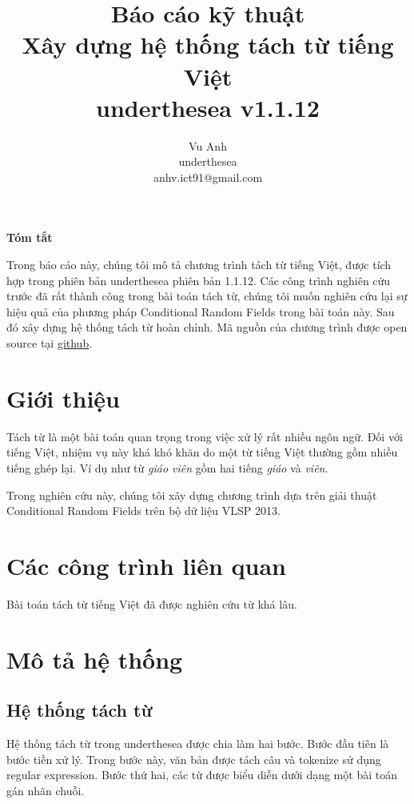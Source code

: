 \documentclass[11pt,a4paper]{article}
\title{Báo cáo kỹ thuật\\ Xây dựng hệ thống tách từ tiếng Việt \\ underthesea v1.1.12}
\author{
Vu Anh\\
underthesea\\
anhv.ict91@gmail.com
}
\date{}
\renewenvironment{abstract}%
		 {\centerline{\large\bf Tóm tắt}%
		  \begin{list}{}%
		     {\setlength{\rightmargin}{0.6cm}%
		      \setlength{\leftmargin}{0.6cm}}%
		   \item[]\ignorespaces}%
		 {\unskip\end{list}}
\begin{document}
\maketitle
\begin{abstract}

Trong báo cáo này, chúng tôi mô tả chương trình tách từ tiếng Việt, được tích hợp trong phiên bản underthesea phiên bản 1.1.12.
Các công trình nghiên cứu trước đã rất thành công trong bài toán tách từ, chúng tôi muốn nghiên cứu lại sự hiệu quả của phương pháp Conditional Random Fields trong bài toán này. Sau đó xây dựng hệ thống tách từ hoàn chỉnh.
Mã nguồn của chương trình được open source tại \href{https://github.com/undertheseanlp/word_tokenize}{github}.

\end{abstract}

\section{Giới thiệu}

Tách từ là một bài toán quan trọng trong việc xử lý rất nhiều ngôn ngữ. Đối với tiếng Việt, nhiệm vụ này khá khó khăn do một từ tiếng Việt thường gồm nhiều tiếng ghép lại. Ví dụ như từ \textit{giáo viên} gồm hai tiếng \textit{giáo} và \textit{viên}.

Trong nghiên cứu này, chúng tôi xây dựng chương trình dựa trên giải thuật Conditional Random Fields trên bộ dữ liệu VLSP 2013.

\section{Các công trình liên quan}

Bài toán tách từ tiếng Việt đã được nghiên cứu từ khá lâu.

\section{Mô tả hệ thống}

\subsection{Hệ thống tách từ}

Hệ thống tách từ trong underthesea được chia làm hai bước. Bước đầu tiên là bước tiền xử lý. Trong bước này, văn bản được tách câu và tokenize sử dụng regular expression. Bước thứ hai, các từ được biểu diễn dưới dạng một bài toán gán nhãn chuỗi.
\end{document}
